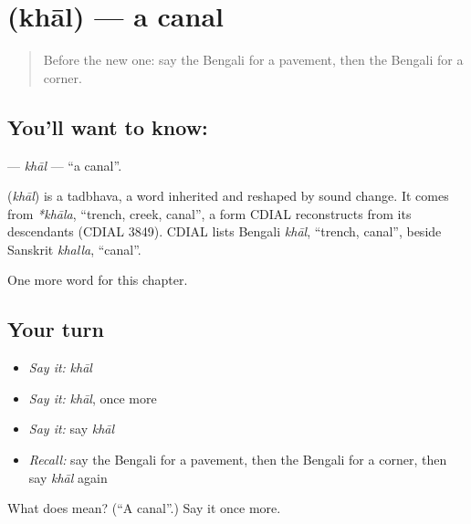 \section[\texorpdfstring{\bn{খাল} (khāl)}{খাল (khāl)}]{ (khāl) — a canal}

\label{lesson:BN-C157-khal}



\begin{quote}
Before the new one: say the Bengali for a pavement, then the Bengali for a corner.
\end{quote}

\subsection*{You'll want to know: }
\textbf{} — \emph{khāl} — \textquotedblleft{}a canal\textquotedblright{}.

\begin{cousinweb}
\textbf{} (\emph{khāl}) is a tadbhava, a word inherited and reshaped by sound change. It comes from \emph{*khāla}, \textquotedblleft{}trench, creek, canal\textquotedblright{}, a form CDIAL reconstructs from its descendants (CDIAL 3849). CDIAL lists Bengali \emph{khāl}, \textquotedblleft{}trench, canal\textquotedblright{}, beside Sanskrit \emph{khalla}, \textquotedblleft{}canal\textquotedblright{}.
\end{cousinweb}

\begin{grammarlens}[title={What you've built}]
One more word for this chapter.
\end{grammarlens}

\subsection*{Your turn}
\begin{itemize}
\raggedright
  \item \emph{Say it:} \emph{khāl}
  \item \emph{Say it:} \emph{khāl}, once more
  \item \emph{Say it:} say \emph{khāl}
  \item \emph{Recall:} say the Bengali for a pavement, then the Bengali for a corner, then say \emph{khāl} again
\end{itemize}

\begin{tcolorbox}[breakable,colback=teal!4,colframe=teal!35!black,title={Before you move on}]
What does  mean? (\textquotedblleft{}A canal\textquotedblright{}.) Say it once more.
\end{tcolorbox}
